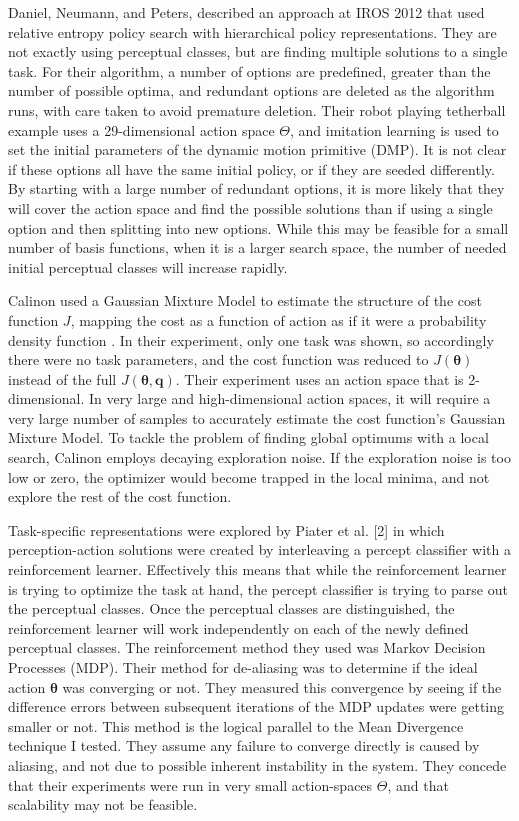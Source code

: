 \documentclass[12pt]{article}
\newcommand{\appsp}  {\ensuremath{\Theta}}
\newcommand{\taskp}  {\ensuremath{\mathbf{q}}}
\newcommand{\costf}  {\ensuremath{J}}
\newcommand{\app}    {\ensuremath{\bm{\theta}}}
\begin{document}
Daniel, Neumann, and Peters, described an approach at IROS 2012 \cite{daniel} that used relative entropy policy search with hierarchical policy representations. They are not exactly using perceptual classes, but are finding multiple solutions to a single task. For their algorithm, a number of options are predefined, greater than the number of possible optima, and redundant options are deleted as the algorithm runs, with care taken to avoid premature deletion. Their robot playing tetherball example uses a 29-dimensional action space $\appsp$, and imitation learning is used to set the initial parameters of the dynamic motion primitive (DMP). It is not clear if these options all have the same initial policy, or if they are seeded differently. By starting with a large number of redundant options, it is more likely that they will cover the action space and find the possible solutions than if using a single option and then splitting into new options. While this may be feasible for a small number of basis functions, when it is a larger search space, the number of needed initial perceptual classes will increase rapidly. 

Calinon used a Gaussian Mixture Model to estimate the structure of the cost function \costf, mapping the cost as a function of action as if it were a probability density function \cite{calinon}. In their experiment, only one task was shown, so accordingly there were no task parameters, and the cost function was reduced to $\costf(\app)$ instead of the full $\costf(\app,\taskp)$. Their experiment uses an action space that is 2-dimensional. In very large and high-dimensional action spaces, it will require a very large number of samples to accurately estimate the cost function's Gaussian Mixture Model. To tackle the problem of finding global optimums with a local search, Calinon employs decaying exploration noise. If the exploration noise is too low or zero, the optimizer would become trapped in the local minima, and not explore the rest of the cost function.

Task-specific representations were explored by Piater et al. [2] in which perception-action solutions were created by interleaving a percept classifier with a reinforcement learner. Effectively this means that while the reinforcement learner is trying to optimize the task at hand, the percept classifier is trying to parse out the perceptual classes. Once the perceptual classes are distinguished, the reinforcement learner will work independently on each of the newly defined perceptual classes. The reinforcement method they used was Markov Decision Processes (MDP). Their method for de-aliasing was to determine if the ideal action $\app$ was converging or not. They measured this convergence by seeing if the difference errors between subsequent iterations of the MDP updates were getting smaller or not. This method is the logical parallel to the Mean Divergence technique I tested. They assume any failure to converge directly is caused by aliasing, and not due to possible inherent instability in the system. They concede that their experiments were run in very small action-spaces $\appsp$, and that scalability may not be feasible. 
\end{document}
